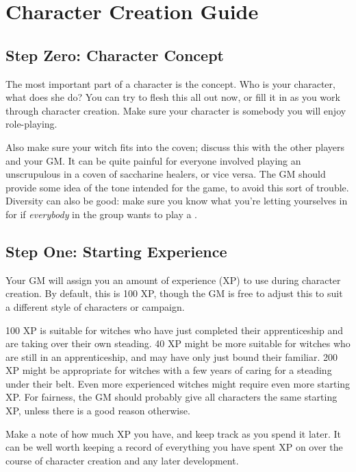 \chapter{Character Creation Guide}

\section{Step Zero: Character Concept}

The most important part of a character is the concept.
Who is your character, what does she do?
You can try to flesh this all out now, or fill it in as you work through character creation.
Make sure your character is somebody you will enjoy role-playing.

Also make sure your witch fits into the coven; discuss this with the other players and your GM.
It can be quite painful for everyone involved playing an unscrupulous  in a coven of saccharine healers, or vice versa.
The GM should provide some idea of the tone intended for the game, to avoid this sort of trouble.
Diversity can also be good: make sure you know what you're letting yourselves in for if \emph{everybody} in the group wants to play a .

\section{Step One: Starting Experience}

Your GM will assign you an amount of experience (XP) to use during character creation.
By default, this is 100 XP, though the GM is free to adjust this to suit a different style of characters or campaign.

100 XP is suitable for witches who have just completed their apprenticeship and are taking over their own steading.
40 XP might be more suitable for witches who are still in an apprenticeship, and may have only just bound their familiar.
200 XP might be appropriate for witches with a few years of caring for a steading under their belt.
Even more experienced witches might require even more starting XP.
For fairness, the GM should probably give all characters the same starting XP, unless there is a good reason otherwise.

Make a note of how much XP you have, and keep track as you spend it later.
It can be well worth keeping a record of everything you have spent XP on over the course of character creation and any later development.

